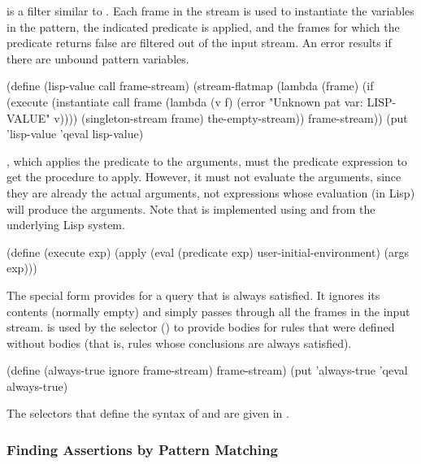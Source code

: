 \noindent
{} is a filter similar to .  Each frame in the stream
is used to instantiate the variables in the pattern, the indicated predicate is
applied, and the frames for which the predicate returns false are filtered out
of the input stream.  An error results if there are unbound pattern variables.

\begin{codeBlock}
(define (lisp-value call frame-stream)
  (stream-flatmap
   (lambda (frame)
     (if (execute
          (instantiate
           call
           frame
           (lambda (v f)
             (error "Unknown pat var: LISP-VALUE" v))))
         (singleton-stream frame)
         the-empty-stream))
   frame-stream))
(put 'lisp-value 'qeval lisp-value)
\end{codeBlock}

\noindent
{}, which applies the predicate to the arguments, must 
the predicate expression to get the procedure to apply.  However, it must not
evaluate the arguments, since they are already the actual arguments, not
expressions whose evaluation (in Lisp) will produce the arguments.  Note that
 is implemented using  and  from the
underlying Lisp system.

\begin{codeBlock}
(define (execute exp)
  (apply (eval (predicate exp) user-initial-environment)
         (args exp)))
\end{codeBlock}

\noindent
The  special form provides for a query that is always
satisfied.  It ignores its contents (normally empty) and simply passes through
all the frames in the input stream.   is used by the
 selector () to provide bodies for rules
that were defined without bodies (that is, rules whose conclusions are always
satisfied).

\begin{codeBlock}
(define (always-true ignore frame-stream) frame-stream)
(put 'always-true 'qeval always-true)
\end{codeBlock}

\noindent
The selectors that define the syntax of  and  are
given in .

\subsubsection{Finding Assertions by Pattern Matching}
\label{Section 4.4.4.3}

